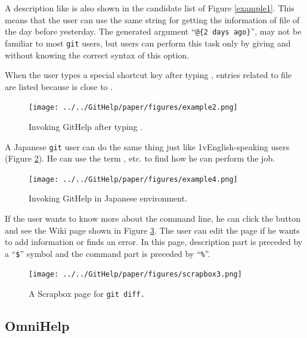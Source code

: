 \documentclass[manuscript,screen,review]{acmart}
\def\GH{\textsf{GitHelp}}
\def\GIT{\texttt{git}}
\def\SB{\textsf{Scrapbox}}
\begin{document}
A description like  is also shown in the candidate list
of Figure \ref{example1}.
This means that the user can use the same string 
for getting the information of  file of the day before yesterday.
The generated argument
``{\smallfont\verb|@{2 days ago}|}'',
may not be familiar to most {\GIT} users,
but users can perform this task only by giving  and 
without knowing the correct syntax of this option.

When the user types a special shortcut key
after typing ,
entries related to  file are listed because
 is close to .

\begin{figure}[h]
  \texttt{[image: ../../GitHelp/paper/figures/example2.png]}
  \caption{Invoking {\GH} after typing .}
  \label{example2}
\end{figure}

A Japanese {\GIT} user can do the same thing just like
1vEnglish-speaking users (Figure \ref{example3}).
He can use the term , etc. to find how he can perform the job.

\begin{figure}[t]
  \texttt{[image: ../../GitHelp/paper/figures/example4.png]}
  \caption{Invoking {\GH} in Japanese environment.}
  \label{example3}
\end{figure}

If the user wants to know more about the command line,
he can click the
button and see the Wiki page shown in Figure \ref{scrapboxpage}.
The user can edit the page if he wants to add information or finds an error.
In this page, description part is preceded by a ``\texttt{\$}'' symbol and
the command part is preceded by ``\texttt{\%}''.


\begin{figure}[t]
  \centerline{\texttt{[image: ../../GitHelp/paper/figures/scrapbox3.png]}}
  \caption{A {\SB} page for \tt{git diff}.}
  \label{scrapboxpage}
\end{figure}





\subsection{OmniHelp}
\end{document}
